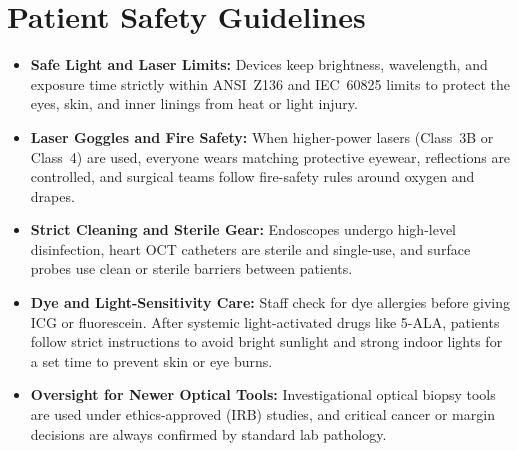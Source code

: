 \section{Patient Safety Guidelines}
\begin{itemize}
  \item \textbf{Safe Light and Laser Limits:} Devices keep brightness, wavelength, and exposure time strictly within ANSI~Z136 and IEC~60825 limits to protect the eyes, skin, and inner linings from heat or light injury.
  \item \textbf{Laser Goggles and Fire Safety:} When higher-power lasers (Class~3B or Class~4) are used, everyone wears matching protective eyewear, reflections are controlled, and surgical teams follow fire-safety rules around oxygen and drapes.
  \item \textbf{Strict Cleaning and Sterile Gear:} Endoscopes undergo high-level disinfection, heart OCT catheters are sterile and single-use, and surface probes use clean or sterile barriers between patients.
  \item \textbf{Dye and Light-Sensitivity Care:} Staff check for dye allergies before giving ICG or fluorescein. After systemic light-activated drugs like 5-ALA, patients follow strict instructions to avoid bright sunlight and strong indoor lights for a set time to prevent skin or eye burns.
  \item \textbf{Oversight for Newer Optical Tools:} Investigational optical biopsy tools are used under ethics-approved (IRB) studies, and critical cancer or margin decisions are always confirmed by standard lab pathology.
\end{itemize}

